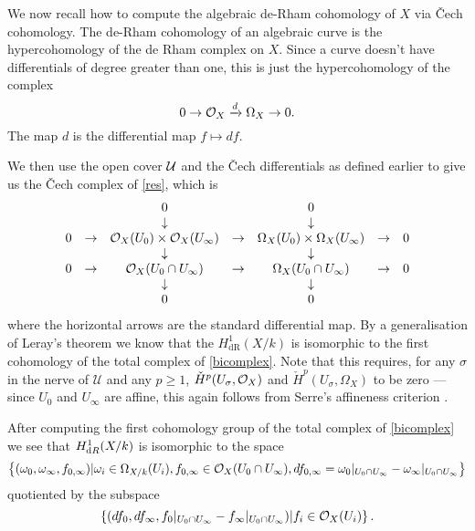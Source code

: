 \documentclass[draft, 11pt]{article} %
\theoremstyle{plain}
\theoremstyle{remark}
\newcommand{\cO}{{\cal O}}
\newcommand{\cU}{{\mathcal U}}
\newcommand{\cech}{\v{C}ech }
\newcommand{\derhamhone}{H_{\text {dR}}^1(X/k)}
\begin{document}
We now recall how to compute the algebraic de-Rham cohomology of $X$ via \cech cohomology.
The de-Rham cohomology of an algebraic curve is the hypercohomology of the de Rham complex on $X$. 
Since a curve doesn't have differentials of degree greater than one, this is just the hypercohomology of the complex
\begin{equation}\label{res}
0 \rightarrow \cO_X \xrightarrow{d} \Omega_X \rightarrow 0.
\end{equation}
The map $d$ is the differential map $f \mapsto df$.

We then use the open cover $\cal U$ and the \cech differentials as defined earlier to give us the \cech complex of \eqref{res}, which is
\begin{equation}\label{bicomplex} \begin{array}{ccccccc}
~ & ~ & 0 & ~ & 0 & ~ & ~ \\
~ & ~ & \downarrow & ~ & \downarrow & ~ & ~ \\
0 & \rightarrow & \cO_X(U_0)\times \cO_X(U_\infty) & \rightarrow & \Omega_X(U_0)\times \Omega_X(U_\infty) & \rightarrow & 0 \\
~ & ~ & \downarrow & ~ & \downarrow & ~ & ~ \\
0 & \rightarrow & \cO_X(U_0 \cap U_\infty) & \rightarrow & \Omega_X(U_0 \cap U_\infty) & \rightarrow & 0 \\
~ & ~ & \downarrow & ~ & \downarrow & ~ & ~ \\
~ & ~ & 0 & ~ & 0 & ~ & ~ \\
\end{array}
\end{equation}
where the horizontal arrows are the standard differential map.
By a generalisation of Leray's theorem \cite[Cor 12.4.7]{EGA0III} we know that the $\derhamhone$ is isomorphic to the first cohomology of the total complex of \eqref{bicomplex}.
Note that this requires, for any $\sigma$ in the nerve of $\cU$ and any $p \geq 1$, ${\check H}^p(U_\sigma, \cO_X)$ and ${\check H}^p(U_\sigma, \Omega_X)$ to be zero ---
since $U_0$ and $U_\infty$ are affine, this again follows from Serre's affineness criterion \cite[Thm 5.2.23]{liu}.



After computing the first cohomology group of the total complex of \eqref{bicomplex} we see that $H^1_{{\text dR}}(X/k)$ is isomorphic to the space
\begin{equation}\label{derhamconditions}
\left\{(\omega_0, \omega_\infty, f_{0,\infty}) | \omega_i\in \Omega_{X/k}(U_i), f_{0,\infty}\in \cO_X(U_0 \cap U_\infty), df_{0,\infty} = \omega_0|_{U_0\cap U_\infty} - \omega_\infty|_{U_0\cap U_\infty} \right\}
\end{equation}
quotiented by the subspace
\begin{equation}\label{quotient}
\left\{  (df_0, df_\infty, f_0|_{U_0\cap U_\infty} -f_\infty|_{U_0\cap U_\infty} )|f_i \in \cO_X(U_i)\right\}.
\end{equation}
\end{document}
